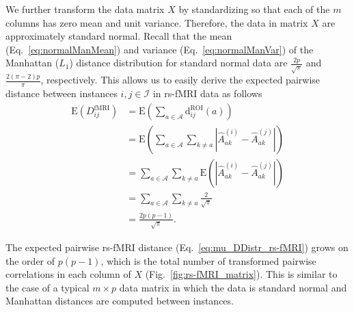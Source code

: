 \documentclass[aoas]{imsart}
\begin{document}
We further transform the data matrix $X$ by standardizing so that each of the $m$ columns has zero mean and unit variance. Therefore, the data in matrix $X$ are approximately standard normal. Recall that the mean (Eq.~\ref{eq:normalManMean}) and variance (Eq.~\ref{eq:normalManVar}) of the Manhattan ($L_1$) distance distribution for standard normal data are $\frac{2p}{\sqrt{\pi}}$ and $\frac{2(\pi - 2)p}{\pi}$, respectively. This allows us to easily derive the expected pairwise distance between instances $i,j \in \mathcal{I}$ in rs-fMRI data as follows
%
\begin{equation}\label{eq:mu_DDistr_rs-fMRI}
\begin{aligned}
\text{E}(D^\text{fMRI}_{ij}) &= \text{E}\left(\sum_{a \in \mathcal{A}} \text{d}^\text{ROI}_{ij}(a)\right) \\
&= \text{E}\left(\sum_{a \in \mathcal{A}} \sum_{k \neq a} \left|\hat{A}^{(i)}_{ak} - \hat{A}^{(j)}_{ak}\right|\right) \\
&= \sum_{a \in \mathcal{A}} \sum_{k \neq a} \text{E}\left(\left|\hat{A}^{(i)}_{ak} - \hat{A}^{(j)}_{ak}\right|\right) \\
&= \sum_{a \in \mathcal{A}} \sum_{k \neq a} \frac{2}{\sqrt{\pi}} \\
&= \frac{2p(p-1)}{\sqrt{\pi}}.
\end{aligned}
\end{equation}

The expected pairwise rs-fMRI distance (Eq.~\ref{eq:mu_DDistr_rs-fMRI}) grows on the order of $p(p-1)$, which is the total number of transformed pairwise correlations in each column of $X$ (Fig.~\ref{fig:rs-fMRI_matrix}). This is similar to the case of a typical $m \times p$ data matrix in which the data is standard normal and Manhattan distances are computed between instances. 
\end{document}
